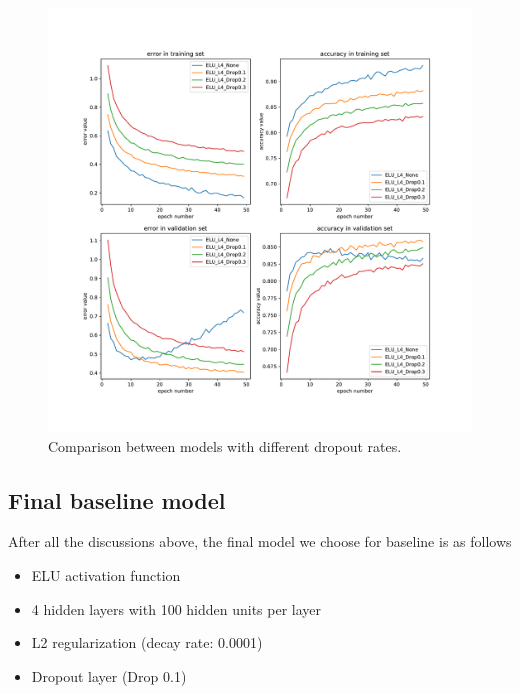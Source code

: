 \documentclass{article}
\begin{document}
\begin{figure}[tb]
\begin{center}
\centerline{\includegraphics[width=\columnwidth]{fig/dropout.pdf}}
\caption{Comparison between models with different dropout rates.}
\label{fig:base_dropout}
\end{center}
\end{figure} 





\subsection{Final baseline model}
After all the discussions above, the final model we choose for baseline is as follows
\begin{itemize}
	\item ELU activation function
	\item 4 hidden layers with 100 hidden units per layer
	\item L2 regularization (decay rate: 0.0001)
	\item Dropout layer (Drop 0.1)
\end{itemize}
\end{document}
